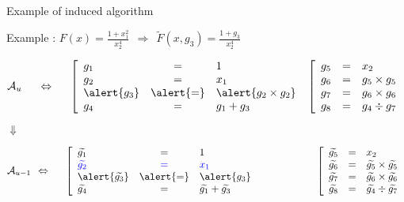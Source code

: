 \begin{frame}{Example of induced algorithm}

    \begin{block}{Example : $F(x) = \frac{1+x_1^2}{x_2^4}\ \ \Rightarrow\ \ \widetilde{F}(x,g_3) = \frac{1+g_3}{x_2^4}$}
        

{\centering%
    
    $
    \Au
    \hskip 0.5cm
    \Leftrightarrow
    \hskip 0.5cm
    \left[
    \begin{array}{l c l}
        g_1 & = & 1 \\   
        g_2 & = & x_1 \\   
        \alert{g_3} & \alert{=} & \alert{g_2 \times g_2} \\  
        g_4 & = & g_1 + g_3 \\
    \end{array}
    \right.
    $
    \hskip 2cm
    $
    \left[
    \begin{array}{l c l}
        g_5 & = & x_2 \\   
        g_6 & = & g_5 \times g_5 \\   
        g_7 & = & g_6 \times g_6 \\  
        g_8 & = & g_4 \div g_7 \\
    \end{array}
    \right.
    $
}

    $\Downarrow$
   
{\centering%
    $
    \Auu
    \hskip 0.15cm
    \Leftrightarrow
    \hskip 0.5cm
    \left[
    \begin{array}{l c l}
        \g{1} & = & 1 \\   
        \textcolor{blue}{\g{2}} & \textcolor{blue}{=} & \textcolor{blue}{x_1} \\   
        \alert{\g{3}} & \alert{=} & \alert{g_3} \\
        \g{4} & = & \g{1} + \g{3} \\
    \end{array}
    \right.
    \hskip 2cm
    \left[
    \begin{array}{l c l}
        \g{5} & = & x_2 \\   
        \g{6} & = & \g{5} \times \g{5} \\   
        \g{7} & = & \g{6} \times \g{6} \\  
        \g{8} & = & \g{4} \div \g{7} \\
    \end{array}
    \right.
    $
}

\end{block}
\end{frame}

